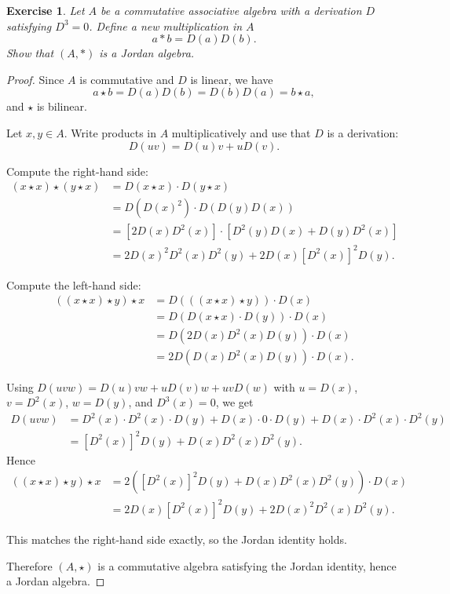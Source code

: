 \documentclass{article}
\newtheorem{exercise}[theorem]{Exercise}
\begin{document}
\begin{exercise}
Let $A$ be a commutative associative algebra with a derivation $D$ satisfying $D^3 = 0$. Define a new multiplication in $A$  
    \[ a \ast b = D(a)D(b). \]  
    Show that $(A, \ast)$ is a Jordan algebra.  
\end{exercise}

\begin{proof}  Since $A$ is commutative and $D$ is linear, we have  
    \[ a \star b = D(a)D(b) = D(b)D(a) = b \star a, \]  
    and $\star$ is bilinear.  

    Let $x,y \in A$. Write products in $A$ multiplicatively and use that $D$ is a derivation:  
    \[ D(uv) = D(u)v + uD(v). \]  

    Compute the right-hand side:  
    \begin{align*}  
        (x \star x) \star (y \star x)  
        &= D(x \star x) \cdot D(y \star x) \\
        &= D(D(x)^2) \cdot D(D(y)D(x)) \\
        &= [2 D(x)D^2(x)] \cdot [D^2(y)D(x) + D(y)D^2(x)] \\
        &= 2 D(x)^2 D^2(x) D^2(y) + 2 D(x)[D^2(x)]^2 D(y).  
    \end{align*}  

    Compute the left-hand side:  
    \begin{align*}  
        ((x \star x) \star y) \star x  
        &= D(((x \star x) \star y)) \cdot D(x) \\
        &= D(D(x \star x) \cdot D(y)) \cdot D(x) \\
        &= D(2 D(x)D^2(x) D(y)) \cdot D(x) \\
        &= 2 D(D(x)D^2(x)D(y)) \cdot D(x).  
    \end{align*}  

    Using $D(uvw) = D(u)vw + uD(v)w + uvD(w)$ with  
    $u = D(x)$, $v = D^2(x)$, $w = D(y)$, and $D^3(x)=0$,  
    we get  
    \begin{align*}  
        D(uvw) &= D^2(x) \cdot D^2(x) \cdot D(y) + D(x) \cdot 0 \cdot D(y) + D(x) \cdot D^2(x) \cdot D^2(y) \\
               &= [D^2(x)]^2 D(y) + D(x) D^2(x) D^2(y).  
    \end{align*}  
    Hence  
    \begin{align*}  
        ((x \star x) \star y) \star x  
        &= 2([D^2(x)]^2 D(y) + D(x) D^2(x) D^2(y)) \cdot D(x) \\
        &= 2 D(x)[D^2(x)]^2 D(y) + 2 D(x)^2 D^2(x) D^2(y).  
    \end{align*}  

    This matches the right-hand side exactly, so the Jordan identity holds.  

Therefore $(A, \star)$ is a commutative algebra satisfying the Jordan identity, hence a Jordan algebra.  
\end{proof}
\end{document}
